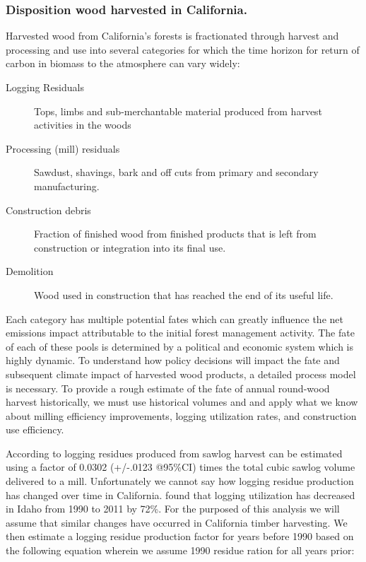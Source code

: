 \documentclass[a4paper]{article}
\begin{document}
\subsubsection{Disposition wood harvested in California.}
\label{sec:orgheadline11}

Harvested wood from California's forests is fractionated through harvest and processing and use into several categories for which the time horizon for return of carbon in biomass to the atmosphere can vary widely:

\begin{description}
\item[{Logging Residuals}] Tops, limbs and sub-merchantable material produced from harvest activities in the woods
\item[{Processing (mill) residuals}] Sawdust, shavings, bark and off cuts from primary and secondary manufacturing.
\item[{Construction debris}] Fraction of finished wood from finished products that is left from construction or integration into its final use.
\item[{Demolition}] Wood used in construction that has reached the end of its useful life.
\end{description}

Each category has multiple potential fates which can greatly influence the net emissions impact attributable to the initial forest management activity.  The fate of each of these pools is determined by a political and economic system which is highly dynamic. To understand how policy decisions will impact the fate and subsequent climate impact of harvested wood products, a detailed process model is necessary. To provide a rough estimate of the fate of annual round-wood harvest historically, we must use historical volumes and and apply what we know about milling efficiency improvements, logging utilization rates, and construction use efficiency. 

According to \citet{Morgan} logging residues produced from sawlog harvest can be estimated using a factor of 0.0302 (+/-.0123 @95\%CI) times the total cubic sawlog volume delivered to a mill. Unfortunately we cannot say how logging residue production has changed over time in California.  \citet{Simmons2014} found that logging utilization has decreased in Idaho from 1990 to 2011 by 72\%. For the purposed of this analysis we will assume that similar changes have occurred in California timber harvesting. We then estimate a logging residue production factor for years before 1990 based on the following equation wherein we assume 1990 residue ration for all years prior:
\end{document}
